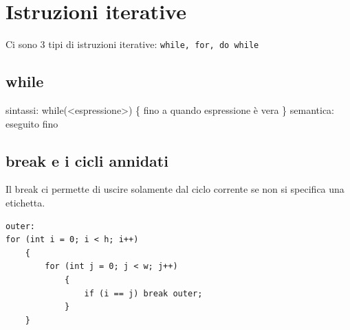 \documentclass[11pt]{article}
\begin{document}
\section{Istruzioni iterative}
\label{sec:org38f18ec}
Ci sono 3 tipi di istruzioni iterative: \texttt{while, for, do while}
\subsection{while}
\label{sec:org48b87ea}
sintassi:
while(<espressione>)
\{
fino a quando espressione è vera
\}
semantica:
eseguito fino
\subsection{break e i cicli annidati}
\label{sec:orgd89fb56}
Il break ci permette di uscire solamente dal ciclo corrente se non si specifica una etichetta.
\begin{verbatim}
outer:
for (int i = 0; i < h; i++)
    {
        for (int j = 0; j < w; j++)
            {
                if (i == j) break outer;
            }
    }


\end{verbatim}
\end{document}
